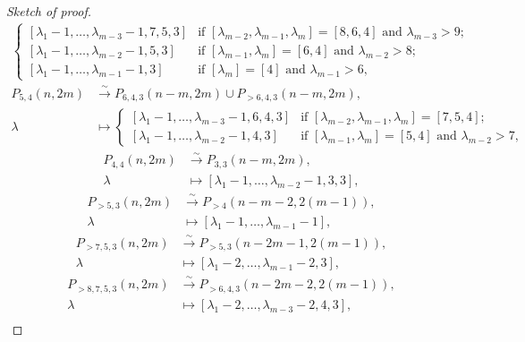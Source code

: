 \documentclass[a4paper, 12pt, reqno]{amsart}
\theoremstyle{remark}
\begin{document}
\begin{proof}[Sketch of proof]
\begin{align*}
\begin{cases}
                [\lambda_1 - 1, \dots, \lambda_{m - 3} - 1, 7, 5, 3] &\text{if $[\lambda_{m - 2}, \lambda_{m - 1}, \lambda_m] = [8, 6, 4]$ and $\lambda_{m - 3} > 9$}; \\
                [\lambda_1 - 1, \dots, \lambda_{m - 2} - 1, 5, 3] &\text{if $[\lambda_{m - 1}, \lambda_m] = [6, 4]$ and $\lambda_{m - 2} > 8$}; \\
                [\lambda_1 - 1, \dots, \lambda_{m - 1} - 1, 3] &\text{if $[\lambda_m] = [4]$ and $\lambda_{m - 1} > 6$},
              \end{cases}
  \end{align*}
  \begin{align*}
    P_{5, 4}(n, 2m) &\xrightarrow{\sim} P_{6, 4, 3}(n - m, 2m) \cup P_{>6, 4, 3}(n - m, 2m), \\
    \lambda &\mapsto
              \begin{cases}
                [\lambda_1 - 1, \dots, \lambda_{m - 3} - 1, 6, 4, 3] &\text{if $[\lambda_{m - 2}, \lambda_{m - 1}, \lambda_m] = [7, 5, 4]$}; \\
                [\lambda_1 - 1, \dots, \lambda_{m - 2} - 1, 4, 3] &\text{if $[\lambda_{m - 1}, \lambda_m] = [5, 4]$ and $\lambda_{m - 2} > 7$},
              \end{cases}
  \end{align*}
  \begin{align*}
    P_{4, 4}(n, 2m) &\xrightarrow{\sim} P_{3, 3}(n - m, 2m), \\
    \lambda &\mapsto [\lambda_1 - 1, \dots, \lambda_{m - 2} - 1, 3, 3],
  \end{align*}
  \begin{align*}
    P_{>5, 3}(n, 2m) &\xrightarrow{\sim} P_{>4}(n - m - 2, 2(m - 1)), \\
    \lambda &\mapsto [\lambda_1 - 1, \dots, \lambda_{m - 1} - 1],
  \end{align*}
  \begin{align*}
    P_{>7, 5, 3}(n, 2m) &\xrightarrow{\sim} P_{>5, 3}(n - 2m - 1, 2(m - 1)), \\
    \lambda &\mapsto [\lambda_1 - 2, \dots, \lambda_{m - 1} - 2, 3],
  \end{align*}
  \begin{align*}
    P_{>8, 7, 5, 3}(n, 2m) &\xrightarrow{\sim} P_{>6, 4, 3}(n - 2m - 2, 2(m - 1)), \\
    \lambda &\mapsto [\lambda_1 - 2, \dots, \lambda_{m - 3} - 2, 4, 3],
  \end{align*}
  \begin{align*}

\end{align*}
\end{proof}
\end{document}

